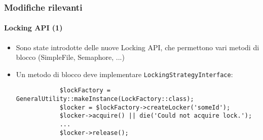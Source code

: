 \begin{frame}[fragile]
	\frametitle{Modifiche rilevanti}
	\framesubtitle{Locking API (1)}

	\begin{itemize}

		\item Sono state introdotte delle nuove Locking API, che permettono vari metodi di blocco (SimpleFile, Semaphore, ...)
		\item Un metodo di blocco deve implementare \small\texttt{LockingStrategyInterface}\normalsize:
		\begin{lstlisting}
			$lockFactory = GeneralUtility::makeInstance(LockFactory::class);
			$locker = $lockFactory->createLocker('someId');
			$locker->acquire() || die('Could not acquire lock.');
			...
			$locker->release();
		\end{lstlisting}

	\end{itemize}

\end{frame}

